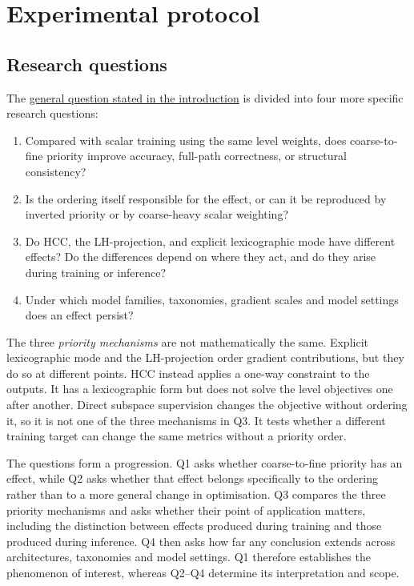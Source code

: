 \section{Experimental protocol}
\label{sec:results_design}

\subsection{Research questions}
\label{ssec:design_questions}

The \hyperref[rq:general]{general question stated in the introduction} is
divided into four more specific research questions:

\begin{enumerate}[label=\textbf{Q\arabic*.},leftmargin=*]
    \item Compared with scalar training using the same level weights, does
    coarse-to-fine priority improve accuracy, full-path correctness, or
    structural consistency?

    \item Is the ordering itself responsible for the effect, or can it be
    reproduced by inverted priority or by coarse-heavy scalar weighting?

    \item Do HCC, the LH-projection, and explicit lexicographic mode have
    different effects? Do the differences depend on where they act, and do they
    arise during training or inference?

    \item Under which model families, taxonomies, gradient scales and model
    settings does an effect persist?
\end{enumerate}

The three \emph{priority mechanisms} are not mathematically the same. Explicit
lexicographic mode and the LH-projection order gradient contributions, but they
do so at different points. HCC instead applies a one-way constraint to the
outputs. It has a lexicographic form but does not solve the level objectives one
after another. Direct subspace supervision changes the objective without
ordering it, so it is not one of the three mechanisms in Q3. It tests whether a
different training target can change the same metrics without a priority order.

The questions form a progression. Q1 asks whether coarse-to-fine priority has an
effect, while Q2 asks whether that effect belongs specifically to the ordering
rather than to a more general change in optimisation. Q3 compares the three
priority mechanisms and asks whether their point of application matters,
including the distinction between effects produced during training and those
produced during inference. Q4 then asks how far any conclusion extends across
architectures, taxonomies and model settings. Q1 therefore establishes the
phenomenon of interest, whereas Q2--Q4 determine its interpretation and scope.

